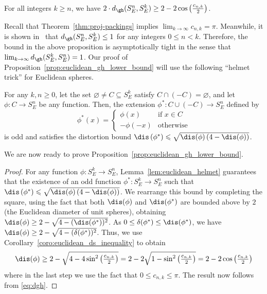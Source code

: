 \documentclass[11pt, reqno, english]{amsart}
\begin{document}
\begin{proposition}\label{prop:euclidean_gh_lower_bound}
For all integers $k\ge n$, we have $2\cdot d_\gh(S_E^n, S_E^k) \geq 2 - 2\cos\left(\frac{c_{n, k}}{2}\right)$.
\end{proposition}
Recall that Theorem~\ref{thm:proj-packings} implies $\lim_{k\to \infty} c_{n, k} = \pi$.
Meanwhile, it is shown in~\cite[Remark~9.1]{lim2021gromov} that $d_\gh(S_E^n, S_E^k)\leq 1$ for any integers $0\leq n< k$.
Therefore, the bound in the above proposition is asymptotically tight in the sense that $\lim_{k\to \infty}d_\gh(S_E^k, S_E^n) = 1$.
Our proof of Proposition~\ref{prop:euclidean_gh_lower_bound} will use the following ``helmet trick'' for Euclidean spheres.

\begin{lemma}\label{lem:euclidean_helmet}
For any $k, n \geq 0$, let the set $\varnothing \neq C \subseteq S_E^k$ satisfy $C \cap(-C)=\varnothing$, and let $\phi\colon C \to S_E^n$ be any function.
Then, the extension $\phi^* \colon C \cup(-C) \to S_E^n$ defined by
\[ \phi^*(x) = \begin{cases}
\phi(x) & \text{if }x\in C \\
-\phi(-x) & \text{otherwise}
\end{cases} \]
is odd and satisfies the distortion bound $\dis\left(\phi^*\right) \leqslant \sqrt{\dis(\phi)\left(4-\dis(\phi)\right)}$.
\end{lemma}

We are now ready to prove Proposition~\ref{prop:euclidean_gh_lower_bound}.

\begin{proof}
For any function $\phi\colon S_E^k \to S_E^{n}$, Lemma~\ref{lem:euclidean_helmet} guarantees that the existence of an odd function $\phi^*\colon S_E^k \to S_E^{n}$ such that $\dis\left(\phi^*\right) \leqslant \sqrt{\dis(\phi)\left(4-\dis(\phi)\right)}$.
We rearrange this bound by completing the square, using the fact that both $\dis(\phi)$ and $\dis(\phi^*)$ are bounded above by $2$ (the Euclidean diameter of unit spheres), obtaining $\dis(\phi)\geq 2 - \sqrt{4 - (\dis(\phi^\ast))^2}$.
As $0\leq \delta(\phi^\ast)\leq \dis(\phi^\ast)$, we have $\dis(\phi)\geq 2 - \sqrt{4 - (\delta(\phi^\ast))^2}$.
Thus, we use Corollary~\ref{coro:euclidean_ds_inequality} to obtain
\[
\dis(\phi) \geq 2 - \sqrt{4 - 4 \sin^2\left(\tfrac{c_{n, k}}{2}\right)} = 2- 2\sqrt{1- \sin^2\left(\tfrac{c_{n, k}}{2}\right)} =  2 - 2\cos\left(\tfrac{c_{n, k}}{2}\right)
\]
where in the last step we use the fact that $0\leq c_{n,k}\leq \pi$.
The result now follows from \eqref{eq:dgh}.
\end{proof}
\end{document}
